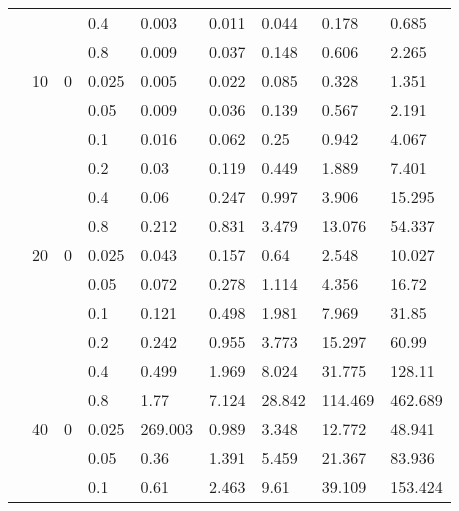 \begin{longtable}{|l|l|l|l|l|l|l|l|l|}
\cmidrule{4-9} &     &          & 0.4            & 0.003      & 0.011      & 0.044      & 0.178      & 0.685      \\
\cmidrule{4-9} &     &          & 0.8            & 0.009      & 0.037      & 0.148      & 0.606      & 2.265      \\
\cmidrule{2-9} & 10  & 0        & 0.025          & 0.005      & 0.022      & 0.085      & 0.328      & 1.351      \\
\cmidrule{4-9} &     &          & 0.05           & 0.009      & 0.036      & 0.139      & 0.567      & 2.191      \\
\cmidrule{4-9} &     &          & 0.1            & 0.016      & 0.062      & 0.25       & 0.942      & 4.067      \\
\cmidrule{4-9} &     &          & 0.2            & 0.03       & 0.119      & 0.449      & 1.889      & 7.401      \\
\cmidrule{4-9} &     &          & 0.4            & 0.06       & 0.247      & 0.997      & 3.906      & 15.295     \\
\cmidrule{4-9} &     &          & 0.8            & 0.212      & 0.831      & 3.479      & 13.076     & 54.337     \\
\cmidrule{2-9} & 20  & 0        & 0.025          & 0.043      & 0.157      & 0.64       & 2.548      & 10.027     \\
\cmidrule{4-9} &     &          & 0.05           & 0.072      & 0.278      & 1.114      & 4.356      & 16.72      \\
\cmidrule{4-9} &     &          & 0.1            & 0.121      & 0.498      & 1.981      & 7.969      & 31.85      \\
\cmidrule{4-9} &     &          & 0.2            & 0.242      & 0.955      & 3.773      & 15.297     & 60.99      \\
\cmidrule{4-9} &     &          & 0.4            & 0.499      & 1.969      & 8.024      & 31.775     & 128.11     \\
\cmidrule{4-9} &     &          & 0.8            & 1.77       & 7.124      & 28.842     & 114.469    & 462.689    \\
\cmidrule{2-9} & 40  & 0        & 0.025          & 269.003    & 0.989      & 3.348      & 12.772     & 48.941     \\
\cmidrule{4-9} &     &          & 0.05           & 0.36       & 1.391      & 5.459      & 21.367     & 83.936     \\
\cmidrule{4-9} &     &          & 0.1            & 0.61       & 2.463      & 9.61       & 39.109     & 153.424    \\

\end{longtable}
